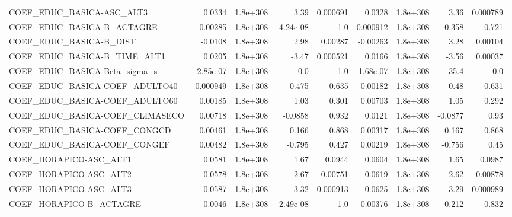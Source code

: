 \begin{tabular}{lrrrrrrrr}
COEF\_EDUC\_BASICA-ASC\_ALT3         &      0.0334 &     1.8e+308 &      3.39 & 0.000691 &     0.0328 &    1.8e+308 &         3.36 &      0.000789 \\
COEF\_EDUC\_BASICA-B\_ACTAGRE        &    -0.00285 &     1.8e+308 &  4.24e-08 &      1.0 &   0.000912 &    1.8e+308 &        0.358 &         0.721 \\
COEF\_EDUC\_BASICA-B\_DIST           &     -0.0108 &     1.8e+308 &      2.98 &  0.00287 &   -0.00263 &    1.8e+308 &         3.28 &       0.00104 \\
COEF\_EDUC\_BASICA-B\_TIME\_ALT1      &      0.0205 &     1.8e+308 &     -3.47 & 0.000521 &     0.0166 &    1.8e+308 &        -3.56 &       0.00037 \\
COEF\_EDUC\_BASICA-Beta\_sigma\_s     &   -2.85e-07 &     1.8e+308 &       0.0 &      1.0 &   1.68e-07 &    1.8e+308 &        -35.4 &           0.0 \\
COEF\_EDUC\_BASICA-COEF\_ADULTO40    &   -0.000949 &     1.8e+308 &     0.475 &    0.635 &    0.00182 &    1.8e+308 &         0.48 &         0.631 \\
COEF\_EDUC\_BASICA-COEF\_ADULTO60    &     0.00185 &     1.8e+308 &      1.03 &    0.301 &    0.00703 &    1.8e+308 &         1.05 &         0.292 \\
COEF\_EDUC\_BASICA-COEF\_CLIMASECO   &     0.00718 &     1.8e+308 &   -0.0858 &    0.932 &     0.0121 &    1.8e+308 &      -0.0877 &          0.93 \\
COEF\_EDUC\_BASICA-COEF\_CONGCD      &     0.00461 &     1.8e+308 &     0.166 &    0.868 &    0.00317 &    1.8e+308 &        0.167 &         0.868 \\
COEF\_EDUC\_BASICA-COEF\_CONGEF      &     0.00482 &     1.8e+308 &    -0.795 &    0.427 &    0.00219 &    1.8e+308 &       -0.756 &          0.45 \\
COEF\_HORAPICO-ASC\_ALT1            &      0.0581 &     1.8e+308 &      1.67 &   0.0944 &     0.0604 &    1.8e+308 &         1.65 &        0.0987 \\
COEF\_HORAPICO-ASC\_ALT2            &      0.0578 &     1.8e+308 &      2.67 &  0.00751 &     0.0619 &    1.8e+308 &         2.62 &       0.00878 \\
COEF\_HORAPICO-ASC\_ALT3            &      0.0587 &     1.8e+308 &      3.32 & 0.000913 &     0.0625 &    1.8e+308 &         3.29 &      0.000989 \\
COEF\_HORAPICO-B\_ACTAGRE           &     -0.0046 &     1.8e+308 & -2.49e-08 &      1.0 &   -0.00376 &    1.8e+308 &       -0.212 &         0.832 \\

\end{tabular}
